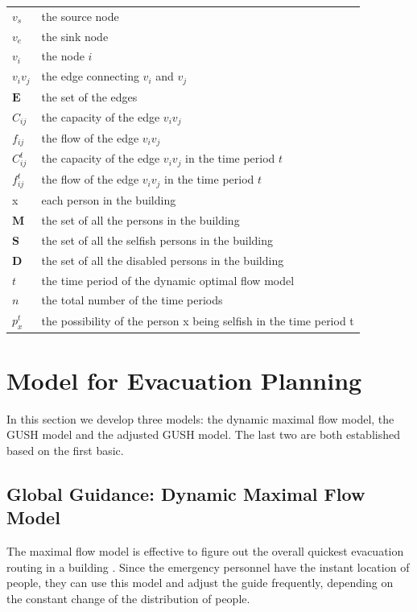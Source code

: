 \documentclass[a4paper,12pt]{article}
\begin{document}
\begin{center}
%
\tablelasttail{\bottomrule}
%
\tablehead{\midrule}
\tabletail{\midrule}

\begin{supertabular}{p{2cm}<{\centering}p{10cm}<{\centering}}
 $v_s$ & the source node \\ 
 $v_e$ & the sink node \\
 $v_i$ & the node $i$\\
 $v_iv_j$ & the edge connecting $v_i$ and $v_j$\\
 $\bm{E}$ & the set of the edges\\
 $C_{ij}$ & the capacity of the edge $v_iv_j$\\
 $f_{ij}$ & the flow of the edge $v_iv_j$\\
 $C^t_{ij}$ & the capacity of the edge $v_iv_j$ in the time period $t$\\ 
 $f^t_{ij}$ & the flow of the edge $v_iv_j$ in the time period $t$\\
 x & each person in the building\\
 $\bm{M}$ & the set of all the persons in the building\\
 $\bm{S}$ & the set of all the selfish persons in the building\\
 $\bm{D}$ & the set of all the disabled persons in the building\\
 $t$ & the time period of the dynamic optimal flow model \\
 $n$& the total number of the time periods\\
 $p^t_x$ & the possibility of the person x being selfish in the time period t\\
\end{supertabular}
\end{center}




\section{Model for Evacuation Planning}
In this section we develop three models: the dynamic maximal flow model, the GUSH model and the adjusted GUSH model. The last two are both established based on the first basic.
\subsection{Global Guidance: Dynamic Maximal Flow Model} 
The maximal flow model is effective to figure out the overall quickest evacuation routing in a building \citep{lim2012capacitated}. Since the emergency personnel have the instant location of people, they can use this model and adjust the guide frequently, depending on the constant change of the distribution of people.
\end{document}
